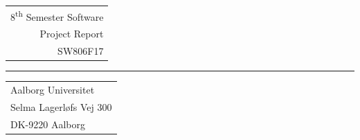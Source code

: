 \begin{titlepage}
\begin{minipage}{0.35\linewidth}
\begin{flushleft}
        \end{flushleft}
    \end{minipage}
    \hfill
    \begin{minipage}{0.3\linewidth}
        \begin{flushright}
        \smallfont
        \begin{tabular}{r}
            8\textsuperscript{th} Semester Software\\[0.2cm]
            Project Report\\[0.2cm]
            SW806F17
        \end{tabular}
        \end{flushright}
    \end{minipage}
    \begin{minipage}{0.02\linewidth}
        \centering
        \rule{1pt}{80pt}
    \end{minipage}
    \begin{minipage}{0.3\linewidth}
        \begin{flushleft}
        \smallfont
        \begin{tabular}{l}
            Aalborg Universitet\\[0.2cm]
            Selma Lagerløfs Vej 300\\[0.2cm]
            DK-9220 Aalborg
        \end{tabular}
        \end{flushleft}
    \end{minipage}
\end{titlepage}
\restoregeometry
\clearpage
\cleardoublepage
